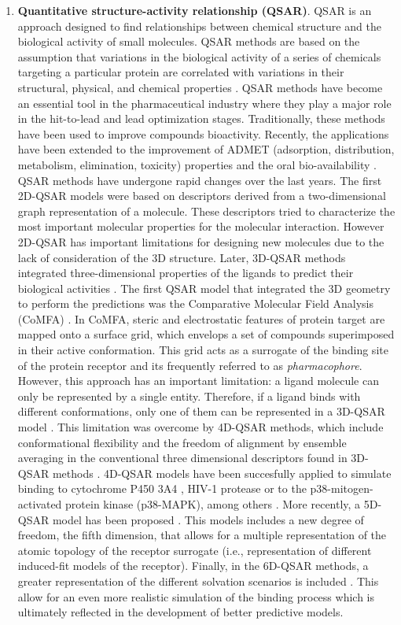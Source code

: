 \documentclass[12pt, b5paper,twoside]{tesi_upf}
\begin{document}
{\begin{enumerate}
\item \textbf{Quantitative structure-activity relationship (QSAR)}\label{qsar}. QSAR is an approach designed to find relationships between chemical structure and the biological activity of small molecules. QSAR methods are based on the assumption that variations in the biological  activity  of  a  series  of  chemicals  targeting a particular protein are correlated  with variations in their structural, physical, and chemical properties \cite{Perkins2003}. QSAR methods have become an essential tool in the pharmaceutical industry where they play a major role in the hit-to-lead and lead optimization stages. Traditionally, these methods have been used to improve compounds bioactivity. Recently, the applications have been extended to the improvement of ADMET (adsorption, distribution, metabolism, elimination, toxicity) properties \cite{Penzotti2004, Obrezanova2007} and the oral bio-availability \cite{Yoshida2000}. QSAR  methods have undergone rapid changes over the last years. The first 2D-QSAR models were based on descriptors derived from a two-dimensional graph representation of a molecule. These descriptors tried to characterize the most important molecular properties for the molecular interaction. However 2D-QSAR has important limitations for designing new molecules due to the lack of consideration of the 3D structure. Later, 3D-QSAR methods integrated three-dimensional properties of the ligands to predict their biological activities \cite{Verma2010}. The first QSAR model that integrated the 3D geometry to perform the predictions was the Comparative Molecular Field Analysis (CoMFA) \cite{Cramer1988}. In CoMFA, steric and electrostatic features of protein target are mapped onto a surface grid, which envelops a set of compounds superimposed in their active conformation. This grid acts as a surrogate of the binding site of the protein receptor and its frequently referred to as \textit{pharmacophore}. However, this approach has an important limitation: a ligand molecule can only be represented by a single entity. Therefore, if a ligand binds with different conformations, only one of them can be represented in a 3D-QSAR model \cite{Verma2010}. This limitation was overcome by 4D-QSAR methods, which include conformational flexibility and the freedom of alignment by ensemble averaging in the conventional three dimensional descriptors found in 3D-QSAR methods \cite{Hopfinger1997}. 4D-QSAR models have been succesfully applied to simulate binding to cytochrome P450 3A4 \cite{Ekins2000}, HIV-1 protease \cite{Iyer2007} or to the p38-mitogen-activated protein kinase (p38-MAPK), \cite{Romeiro2010} among others \cite{Andrade2010}. More recently, a 5D-QSAR model has been proposed \cite{Vedani2002}. This models includes a new degree of freedom, the fifth dimension, that allows for a multiple representation of the atomic topology of the receptor surrogate (i.e., representation of different induced-fit models of the receptor). Finally, in the 6D-QSAR methods, a greater representation of the different solvation scenarios is included \cite{Vedani2005}. This allow for an even more realistic simulation of the binding process which  is ultimately reflected in the development of better predictive models.   

\end{enumerate}}
\end{document}
